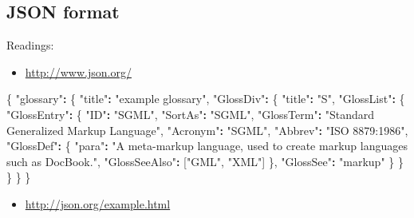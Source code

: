\documentclass[]{book}
\newenvironment{Shaded}{\begin{snugshade}}{\end{snugshade}}
\newcommand{\StringTok}[1]{\textcolor[rgb]{0.31,0.60,0.02}{#1}}
\newcommand{\OperatorTok}[1]{\textcolor[rgb]{0.81,0.36,0.00}{\textbf{#1}}}
\newcommand{\NormalTok}[1]{#1}
\providecommand{\tightlist}{%
  \setlength{\itemsep}{0pt}\setlength{\parskip}{0pt}}
\theoremstyle{definition}
\theoremstyle{definition}
\theoremstyle{definition}
\theoremstyle{remark}
\begin{document}
\subsection{JSON format}\label{json-format}

Readings:

\begin{itemize}
\tightlist
\item
  \url{http://www.json.org/}
\end{itemize}

\begin{Shaded}
\begin{Highlighting}[]
\NormalTok{\{}
    \StringTok{"glossary"}\OperatorTok{:}\StringTok{ }\NormalTok{\{}
        \StringTok{"title"}\OperatorTok{:}\StringTok{ "example glossary"}\NormalTok{,}
        \StringTok{"GlossDiv"}\OperatorTok{:}\StringTok{ }\NormalTok{\{}
            \StringTok{"title"}\OperatorTok{:}\StringTok{ "S"}\NormalTok{,}
            \StringTok{"GlossList"}\OperatorTok{:}\StringTok{ }\NormalTok{\{}
                \StringTok{"GlossEntry"}\OperatorTok{:}\StringTok{ }\NormalTok{\{}
                    \StringTok{"ID"}\OperatorTok{:}\StringTok{ "SGML"}\NormalTok{,}
                    \StringTok{"SortAs"}\OperatorTok{:}\StringTok{ "SGML"}\NormalTok{,}
                    \StringTok{"GlossTerm"}\OperatorTok{:}\StringTok{ "Standard Generalized Markup Language"}\NormalTok{,}
                    \StringTok{"Acronym"}\OperatorTok{:}\StringTok{ "SGML"}\NormalTok{,}
                    \StringTok{"Abbrev"}\OperatorTok{:}\StringTok{ "ISO 8879:1986"}\NormalTok{,}
                    \StringTok{"GlossDef"}\OperatorTok{:}\StringTok{ }\NormalTok{\{}
                        \StringTok{"para"}\OperatorTok{:}\StringTok{ "A meta-markup language, used to create markup languages such as DocBook."}\NormalTok{,}
                        \StringTok{"GlossSeeAlso"}\OperatorTok{:}\StringTok{ }\NormalTok{[}\StringTok{"GML"}\NormalTok{, }\StringTok{"XML"}\NormalTok{]}
\NormalTok{                    \},}
                    \StringTok{"GlossSee"}\OperatorTok{:}\StringTok{ "markup"}
\NormalTok{                \}}
\NormalTok{            \}}
\NormalTok{        \}}
\NormalTok{    \}}
\NormalTok{\}}
\end{Highlighting}
\end{Shaded}

\begin{itemize}
\tightlist
\item
  \url{http://json.org/example.html}
\end{itemize}
\end{document}
